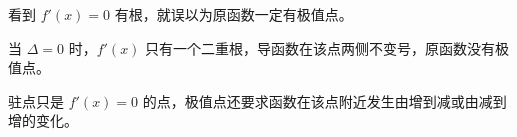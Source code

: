 \begin{trapbox}
	\medskip
	\begin{description}[style=nextline, leftmargin=2.8em, labelsep=0.5em, itemsep=0.35em]
		\item[\textbf{\textcolor{CTrap}{易错点四（把 $\Delta=0$ 当成有极值）：}}]
		      看到 $f'(x)=0$ 有根，就误以为原函数一定有极值点。
		\item[\textbf{\textcolor{CTrap}{正确理解（重根不变号）：}}]
		      当 $\Delta=0$ 时，$f'(x)$ 只有一个二重根，导函数在该点两侧不变号，原函数没有极值点。
		\item[\textbf{\textcolor{CTrap}{错因分析（混淆驻点与极值点）：}}]
		      驻点只是 $f'(x)=0$ 的点，极值点还要求函数在该点附近发生由增到减或由减到增的变化。
	\end{description}
\end{trapbox}